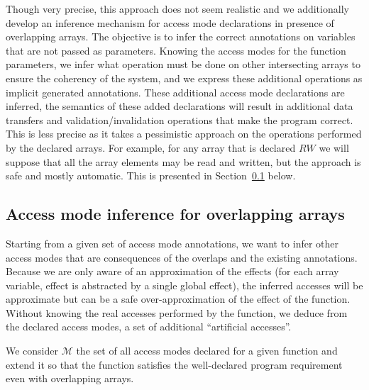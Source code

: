 \documentclass[preprint,12pt]{elsarticle}
\newcommand{\AM}{\mathcal{M}}
\begin{document}
Though very precise, this approach does not seem realistic and we additionally develop an inference mechanism for access mode declarations in presence of overlapping arrays.
The objective  is to infer the correct annotations on  variables that are not passed as parameters. Knowing the access modes for the function parameters, we infer what operation must be done on other intersecting arrays to ensure the coherency of the system, and we express these additional operations as implicit generated annotations. These additional access mode declarations are inferred, the semantics of these added declarations will result in additional data transfers and validation/invalidation operations that make the program correct. This is less precise as it takes a pessimistic approach on the operations performed by the declared arrays. For example, for any array that is declared $RW$ we will suppose that all the array elements may be read and written, but the approach is safe and mostly automatic. This is presented in Section~\ref{sec:infer-overlap} below.
%



\subsection{Access mode inference for overlapping arrays}\label{sec:infer-overlap}
Starting from a given set of access mode annotations, we want to infer other access modes that are consequences of the overlaps and the existing annotations.
Because we are only aware of an approximation of the effects (for each array variable, effect is abstracted by a single global effect), the inferred accesses will be approximate but can be a safe over-approximation of the effect of the function.
 Without knowing the real accesses performed by the function, we deduce from the declared access modes, a set of additional ``artificial accesses''.

We consider $\AM$ the set of all access modes declared for a given function and extend it so that the function satisfies the well-declared program requirement even with overlapping arrays.
\end{document}
